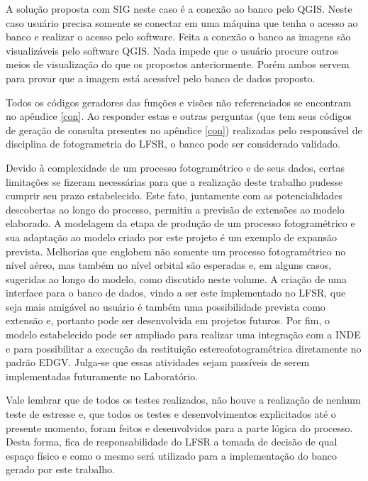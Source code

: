 A solução proposta com SIG neste caso é a conexão ao banco pelo QGIS. Neste caso usuário precisa somente se conectar em uma máquina que tenha o acesso ao banco e realizar o acesso pelo software. Feita a conexão o banco as imagens são visualizáveis pelo software QGIS. Nada impede que o usuário procure outros meios de visualização do que os propostos anteriormente. Porém ambos servem para provar que a imagem está acessível pelo banco de dados proposto.

Todos os códigos geradores das funções e visões não referenciados se encontram no apêndice \ref{con}. Ao responder estas e outras perguntas (que tem seus códigos de geração de consulta presentes no apêndice \ref{con}) realizadas pelo responsável de disciplina de fotogrametria do LFSR, o banco pode ser considerado validado.

Devido à complexidade de um processo fotogramétrico e de seus dados, certas limitações se fizeram necessárias para que a realização deste trabalho pudesse cumprir seu prazo estabelecido. Este fato, juntamente com as potencialidades descobertas ao longo do processo, permitiu a previsão de extensões ao modelo elaborado. A modelagem da etapa de produção de um processo fotogramétrico e sua adaptação ao modelo criado por este projeto é um exemplo de expansão prevista. Melhorias que englobem não somente um processo fotogramétrico no nível aéreo, mas também no nível orbital são esperadas e, em alguns casos, sugeridas ao longo do modelo, como discutido neste volume. A criação de uma interface para o banco de dados, vindo a ser este implementado no LFSR, que seja mais amigável ao usuário é também uma possibilidade prevista como extensão e, portanto pode ser desenvolvida em projetos futuros. Por fim, o modelo estabelecido pode ser ampliado para realizar uma integração com a INDE e para possibilitar a execução da restituição estereofotogramétrica diretamente no padrão EDGV. Julga-se que essas atividades sejam passíveis de serem implementadas futuramente no Laboratório.

Vale lembrar que de todos os testes realizados, não houve a realização de nenhum teste de estresse e, que todos os testes e desenvolvimentos explicitados até o presente momento, foram feitos e desenvolvidos para a parte lógica do processo. Desta forma, fica de responsabilidade do LFSR a tomada de decisão de qual espaço físico e como o mesmo será utilizado para a implementação do banco gerado por este trabalho.


